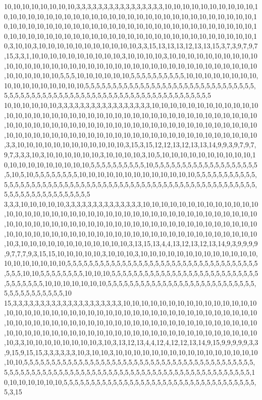 10,10,10,10,10,10,10,10,3,3,3,3,3,3,3,3,3,3,3,3,3,3,3,3,10,10,10,10,10,10,10,10,10,10,10,10,10,10,10,10,10,10,10,10,10,10,10,10,10,10,10,10,10,10,10,10,10,10,10,10,10,10,10,10,10,10,10,10,10,10,10,10,10,10,10,10,10,10,10,10,10,10,10,10,10,10,10,10,10,10,10,10,10,10,10,10,10,10,10,10,10,10,10,10,10,10,10,10,10,10,10,10,10,10,10,10,10,10,10,3,10,10,3,10,10,10,10,10,10,10,10,10,10,10,3,3,15,13,13,13,12,13,13,15,3,7,3,9,7,9,7,15,3,3,1,10,10,10,10,10,10,10,10,10,10,3,10,10,10,10,3,10,10,10,10,10,10,10,10,10,10,10,10,10,10,10,10,10,10,10,10,10,10,10,10,10,10,10,10,10,10,10,10,10,10,10,10,10,10,10,10,10,10,10,10,5,5,5,10,10,10,10,10,10,5,5,5,5,5,5,5,5,5,5,10,10,10,10,10,10,10,10,10,10,10,10,10,10,10,10,10,5,5,5,5,5,5,5,5,5,5,5,5,5,5,5,5,5,5,5,5,5,5,5,5,5,5,5,5,5,5,5,5,5,5,5,5,5,5,5,5,5,5,5,5,5,5,5,5,5,5,5,5,5,5,5,5,5,5,5,5,5,5,5,5,5,5,5,5,5
10,10,10,10,10,10,3,3,3,3,3,3,3,3,3,3,3,3,3,3,3,3,3,10,10,10,10,10,10,10,10,10,10,10,10,10,10,10,10,10,10,10,10,10,10,10,10,10,10,10,10,10,10,10,10,10,10,10,10,10,10,10,10,10,10,10,10,10,10,10,10,10,10,10,10,10,10,10,10,10,10,10,10,10,10,10,10,10,10,10,10,10,10,10,10,10,10,10,10,10,10,10,10,10,10,10,10,10,10,10,10,10,10,10,10,10,10,10,10,3,3,10,10,10,10,10,10,10,10,10,10,10,10,3,15,3,15,12,12,13,12,13,13,14,9,9,3,9,7,9,7,9,7,3,3,3,10,3,10,10,10,10,10,10,3,10,10,10,10,3,10,5,10,10,10,10,10,10,10,10,10,10,10,10,10,10,10,10,10,10,10,10,5,5,5,5,5,5,5,5,5,5,10,5,5,5,5,5,5,5,5,5,5,5,5,5,5,5,5,5,5,5,5,10,5,10,5,5,5,5,5,5,5,5,10,10,10,10,10,10,10,10,10,10,10,10,10,5,5,5,5,5,5,5,5,5,5,5,5,5,5,5,5,5,5,5,5,5,5,5,5,5,5,5,5,5,5,5,5,5,5,5,5,5,5,5,5,5,5,5,5,5,5,5,5,5,5,5,5,5,5,5,5,5,5,5,5,5,5,5,5,5,5,5,5,5,5,5,5,5
3,3,3,10,10,10,10,10,3,3,3,3,3,3,3,3,3,3,3,3,3,3,10,10,10,10,10,10,10,10,10,10,10,10,10,10,10,10,10,10,10,10,10,10,10,10,10,10,10,10,10,10,10,10,10,10,10,10,10,10,10,10,10,10,10,10,10,10,10,10,10,10,10,10,10,10,10,10,10,10,10,10,10,10,10,10,10,10,10,10,10,10,10,10,10,10,10,10,10,10,10,10,10,10,10,10,10,10,10,10,10,10,10,10,10,10,10,10,10,10,3,10,10,10,10,10,10,10,10,10,10,10,10,3,13,15,13,4,4,13,12,13,12,13,14,9,3,9,9,9,9,9,7,7,7,9,3,15,15,10,10,10,10,10,3,10,10,10,3,10,10,10,10,10,10,10,10,10,10,10,10,10,10,10,10,10,10,10,10,5,5,5,5,5,5,5,5,5,5,5,5,5,5,5,5,5,5,5,5,5,5,5,5,5,5,5,5,5,5,5,5,5,5,5,5,5,5,10,10,5,5,5,5,5,5,5,5,10,10,10,5,5,5,5,5,5,5,5,5,5,5,5,5,5,5,5,5,5,5,5,5,5,5,5,5,5,5,5,5,5,5,5,5,5,10,10,10,10,10,10,10,5,5,5,5,5,5,5,5,5,5,5,5,5,5,5,5,5,5,5,5,5,5,5,5,5,5,5,5,5,5,5,5,5,5,5,5,5,5,10
15,3,3,3,3,3,3,3,3,3,3,3,3,3,3,3,3,3,3,3,3,10,10,10,10,10,10,10,10,10,10,10,10,10,10,10,10,10,10,10,10,10,10,10,10,10,10,10,10,10,10,10,10,10,10,10,10,10,10,10,10,10,10,10,10,10,10,10,10,10,10,10,10,10,10,10,10,10,10,10,10,10,10,10,10,10,10,10,10,10,10,10,10,10,10,10,10,10,10,10,10,10,10,10,10,10,10,10,10,10,10,10,10,10,10,10,10,10,10,10,10,3,3,10,10,10,10,10,10,10,10,3,10,3,13,12,13,4,4,12,4,12,12,13,14,9,15,9,9,9,9,9,3,3,9,15,9,15,15,3,3,3,3,3,3,10,3,10,10,3,10,10,10,10,10,10,10,10,10,10,10,10,10,10,10,10,10,10,5,5,5,5,5,5,5,5,5,5,5,5,5,5,5,5,5,5,5,5,5,5,5,5,5,5,5,5,5,5,5,5,5,5,5,5,5,5,5,5,5,5,5,5,5,5,5,5,5,5,5,5,5,5,5,5,5,5,5,5,5,5,5,5,5,5,5,5,5,5,5,5,5,5,5,5,5,5,5,5,5,5,5,5,5,5,5,10,10,10,10,10,10,10,5,5,5,5,5,5,5,5,5,5,5,5,5,5,5,5,5,5,5,5,5,5,5,5,5,5,5,5,5,5,5,5,5,5,5,5,3,15
